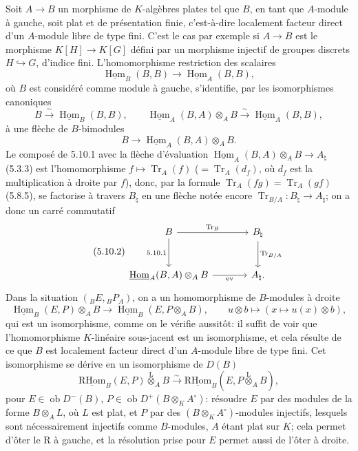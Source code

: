 \documentclass[11pt]{article}
\DeclareMathOperator{\Hom}{Hom}
\newcommand{\R}{\mathrm{R}}\newcommand{\RHomCore}{\mathrm{RHom}}
\newcommand{\ob}{\operatorname{ob}}
\providecommand{\RHom}{\RHomCore}
\providecommand{\uRHom}{\underline{\RHom}}
\providecommand{\uHom}{\underline{\Hom}}
\providecommand{\Tr}{\operatorname{Tr}}
\providecommand{\Tr}{\operatorname{Tr}}
\providecommand{\lten}{\overset{\mathrm L}{\otimes}}
\providecommand{\Tr}{\operatorname{Tr}}
\providecommand{\RHom}{\RHomCore}
\providecommand{\Hom}{\operatorname{Hom}}
\providecommand{\ob}{\operatorname{ob}}
\providecommand{\lten}{\overset{\mathrm L}{\otimes}}
\providecommand{\RHom}{\R\mathcal{H}om}
\providecommand{\lten}{\overset{\mathrm L}{\otimes}}
\providecommand{\R}{\mathrm R}
\providecommand{\Tr}{\operatorname{Tr}}
\providecommand{\lten}{\overset{\mathrm L}{\otimes}}
\providecommand{\lten}{\overset{\mathrm L}{\otimes}}
\providecommand{\lten}{\overset{\mathrm L}{\otimes}}
\providecommand{\RHom}{\RHomCore}
\providecommand{\Hom}{\operatorname{Hom}}
\providecommand{\Tr}{\operatorname{Tr}}
\providecommand{\lten}{\overset{\mathrm L}{\otimes}}
\begin{document}
Soit $A\to B$ un morphisme de $K$-algèbres plates tel que $B$, en tant que $A$-module à gauche, soit plat et de présentation finie, c'est-à-dire localement facteur direct d'un $A$-module libre de type fini. C'est le cas par exemple si $A\to B$ est le morphisme $K[H]\to K[G]$ défini par un morphisme injectif de groupes discrets $H\hookrightarrow G$, d'indice fini. L'homomorphisme restriction des scalaires
\[
\uHom_B(B,B)\longrightarrow\uHom_A(B,B),
\]
où $B$ est considéré comme module à gauche, s'identifie, par les isomorphismes canoniques
\[
B\xrightarrow{\sim}\uHom_B(B,B),\qquad \uHom_A(B,A)\otimes_AB\xrightarrow{\sim}\uHom_A(B,B),
\]
à une flèche de $B$-bimodules
\begin{equation}\tag{5.10.1}
B\longrightarrow\uHom_A(B,A)\otimes_AB.
\end{equation}
Le composé de 5.10.1 avec la flèche d'évaluation $\uHom_A(B,A)\otimes_AB\to A_\natural$ (5.3.3) est l'homomorphisme $f\mapsto\Tr_A(f)$ ($=\Tr_A(d_f)$, où $d_f$ est la multiplication à droite par $f$), donc, par la formule $\Tr_A(fg)=\Tr_A(gf)$ (5.8.5), se factorise à travers $B_\natural$ en une flèche notée encore $\Tr_{B/A}:B_\natural\to A_\natural$; on a donc un carré commutatif
\begin{equation}\tag{5.10.2}
\begin{tikzcd}[column sep=large,row sep=large]
B \arrow[r,"\Tr_B"] \arrow[d,"5.10.1"'] & B_\natural \arrow[d,"\Tr_{B/A}"]\\
\uHom_A(B,A)\otimes_AB \arrow[r,"\mathrm{ev}"'] & A_\natural .
\end{tikzcd}
\end{equation}
Dans la situation $({}_BE,{}_BP_A)$, on a un homomorphisme de $B$-modules à droite
\begin{equation}\tag{5.10.3}
\uHom_B(E,P)\otimes_AB\longrightarrow\uHom_B(E,P\otimes_AB),\qquad
u\otimes b\longmapsto(x\longmapsto u(x)\otimes b),
\end{equation}
qui est un isomorphisme, comme on le vérifie aussitôt: il suffit de voir que l'homomorphisme $K$-linéaire sous-jacent est un isomorphisme, et cela résulte de ce que $B$ est localement facteur direct d'un $A$-module libre de type fini. Cet isomorphisme se dérive en un isomorphisme de $D(B)$
\begin{equation}\tag{5.10.4}
\uRHom_B(E,P)\lten_AB\xrightarrow{\sim}\uRHom_B(E,P\lten_AB),
\end{equation}
pour $E\in\ob D^-(B)$, $P\in\ob D^+(B\otimes_KA^\circ)$: résoudre $E$ par des modules de la forme $B\otimes_AL$, où $L$ est plat, et $P$ par des $(B\otimes_KA^\circ)$-modules injectifs, lesquels sont nécessairement injectifs comme $B$-modules, $A$ étant plat sur $K$; cela permet d'ôter le $\R$ à gauche, et la résolution prise pour $E$ permet aussi de l'ôter à droite.
\end{document}
